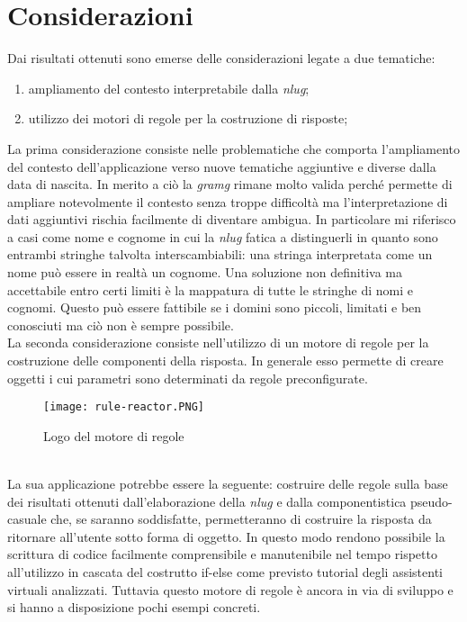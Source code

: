 \section{Considerazioni}
Dai risultati ottenuti sono emerse delle considerazioni legate a due tematiche:
\begin{enumerate}
	\item ampliamento del contesto interpretabile dalla \emph{\gls{nlug}};
	\item utilizzo dei motori di regole per la costruzione di risposte; 
\end{enumerate}
La prima considerazione consiste nelle problematiche che comporta l'ampliamento del contesto dell'applicazione verso nuove tematiche aggiuntive e diverse dalla data di nascita. In merito a ciò la \emph{\gls{gramg}} rimane molto valida perché permette di ampliare notevolmente il contesto senza troppe difficoltà ma l'interpretazione di dati aggiuntivi rischia facilmente di diventare ambigua. In particolare mi riferisco a casi come nome e cognome in cui la \emph{\gls{nlug}} fatica a distinguerli in quanto sono entrambi stringhe talvolta interscambiabili: una stringa interpretata come un nome può essere in realtà un cognome. Una soluzione non definitiva ma accettabile entro certi limiti è la mappatura di tutte le stringhe di nomi e cognomi. Questo può essere fattibile se i domini sono piccoli, limitati e ben conosciuti ma ciò non è sempre possibile. \\
La seconda considerazione consiste nell'utilizzo di un motore di regole per la costruzione delle componenti della risposta. In generale esso permette di creare oggetti i cui parametri sono determinati da regole preconfigurate. \\
\begin{figure}[htbp]
	\begin{center}
		\texttt{[image: rule-reactor.PNG]}
		\caption{Logo del motore di regole}
	\end{center}
\end{figure}
\\
La sua applicazione potrebbe essere la seguente: costruire delle regole sulla base dei risultati ottenuti dall'elaborazione della \emph{\gls{nlug}} e dalla componentistica pseudo-casuale che, se saranno soddisfatte, permetteranno di costruire la risposta da ritornare all'utente sotto forma di oggetto. In questo modo rendono possibile la scrittura di codice facilmente comprensibile e manutenibile nel tempo rispetto all'utilizzo in cascata del costrutto if-else come previsto tutorial degli assistenti virtuali analizzati. Tuttavia questo motore di regole è ancora in via di sviluppo e si hanno a disposizione pochi esempi concreti.